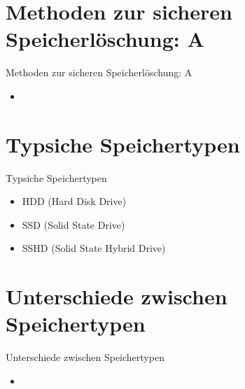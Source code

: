 \documentclass{beamer}
\begin{document}
\section{Methoden zur sicheren Speicherlöschung: A}
\begin{frame}{Methoden zur sicheren Speicherlöschung: A}
	\begin{itemize}
		\item 
	\end{itemize}
\end{frame}

\section{Typsiche Speichertypen}
\begin{frame}{Typsiche Speichertypen}
	\begin{itemize}
		\item HDD (Hard Disk Drive)
		\item SSD (Solid State Drive)
		\item SSHD (Solid State Hybrid Drive)
	\end{itemize}
\end{frame}

\section{Unterschiede zwischen Speichertypen}
\begin{frame}{Unterschiede zwischen Speichertypen}
	\begin{itemize}
		\item 
	\end{itemize}
\end{frame}

\end{document}
